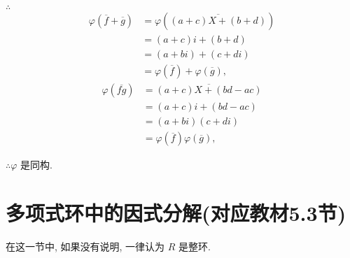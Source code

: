 \documentclass[color=black,device=normal,lang=cn,mode=geye]{elegantnote}
\begin{document}
\begin{example}
    $\therefore$
    \begin{align*}
        \varphi(\overline{f}+\overline{g}) & =\varphi(\overline{(a+c)X+(b+d)}) \\
        & =(a+c)i+(b+d) \\
        & =(a+bi)+(c+di) \\
        & =\varphi(\overline{f})+\varphi(\overline{g}),
    \end{align*}
    \begin{align*}
        \varphi(\overline{fg}) & =\overline{(a+c)X+(bd-ac)} \\
        & =(a+c)i+(bd-ac) \\
        & =(a+bi)(c+di) \\
        & =\varphi(\overline{f})\varphi(\overline{g}),
    \end{align*}

    $\therefore\varphi$ 是同构.
\end{example}
\section{多项式环中的因式分解(对应教材5.3节)}
在这一节中, 如果没有说明, 一律认为 $R$ 是整环.
\end{document}
